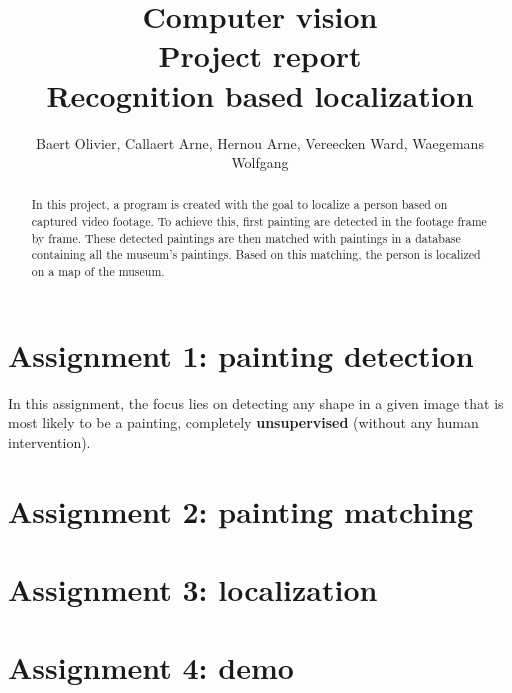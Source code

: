\documentclass[letterpaper,12pt]{article}
\begin{document}
\title{ Computer vision \protect\\ Project report \protect\\ Recognition based localization}
\author{Baert Olivier, Callaert Arne, Hernou Arne, Vereecken Ward, Waegemans Wolfgang}
\maketitle

\begin{abstract}
In this project, a program is created with the goal to localize a person based on captured video footage. To achieve this, first painting are detected in the footage frame by frame. These detected paintings are then matched with paintings in a database containing all the museum's paintings. Based on this matching, the person is localized on a map of the museum.
\end{abstract}

\section{Assignment 1: painting detection}

In this assignment, the focus lies on detecting any shape in a given image that is most likely to be a painting, completely \textbf{unsupervised} (without any human intervention). 

\section{Assignment 2: painting matching}

\section{Assignment 3: localization}

\section{Assignment 4: demo}

\end{document}
